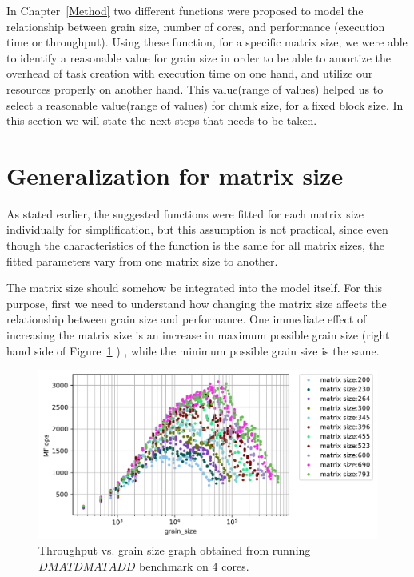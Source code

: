
In Chapter~\ref{Method} two different functions were proposed to model the relationship between grain size, number of cores, and performance (execution time or throughput). Using these function, for a specific matrix size, we were able to identify a reasonable value for grain size in order to be able to amortize the overhead of task creation with execution time on one hand, and utilize our resources properly on another hand. This value(range of values) helped us to select a reasonable value(range of values) for chunk size, for a fixed block size.
In this section we will state the next steps that needs to be taken.
\vspace{\baselineskip}	

\section{Generalization for matrix size}
As stated earlier, the suggested functions were fitted for each matrix size individually for simplification, but this assumption is not practical, since even though the characteristics of the function is the same for all matrix sizes, the fitted parameters vary from one matrix size to another. 

The matrix size should somehow be integrated into the model itself. For this purpose, first we need to understand how changing the matrix size affects the relationship between grain size and performance. 
One immediate effect of increasing the matrix size is an increase in maximum possible grain size (right hand side of Figure~\ref{fig19} ) , while the minimum possible grain size is the same.

\vspace{\baselineskip}	
\begin{figure}[H]	
	\centering\includegraphics[scale=.75]{images/fig11.png}			
	\caption{Throughput vs. grain size graph obtained from running $DMATDMATADD$ benchmark  on $4$ cores.}
	\label{fig19}	
\end{figure} 


